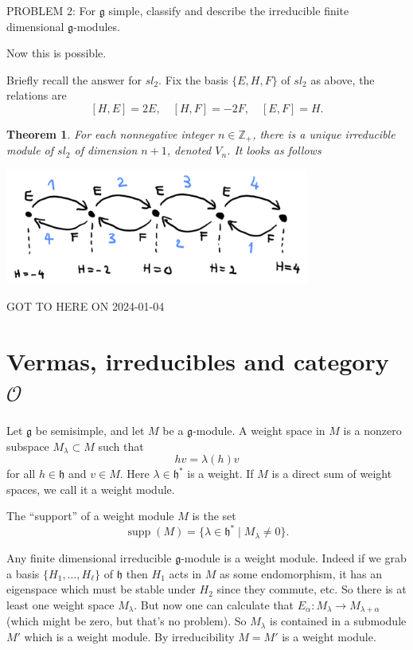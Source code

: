 \documentclass[12pt]{article}
\theoremstyle{plain}
\newtheorem{thm}{Theorem}[section]
\theoremstyle{definition}
\numberwithin{equation}{section}
\DeclareMathOperator{\supp}{supp}
\newcommand{\al}{\alpha}
\newcommand{\la}{\lambda}
\newcommand{\Z}{\mathbb{Z}}
\newcommand{\g}{\mathfrak{g}}
\newcommand{\h}{\mathfrak{h}}
\newcommand{\OO}{\mathcal{O}}
\begin{document}
PROBLEM 2: For $\g$ simple, classify and describe the irreducible finite dimensional $\g$-modules.

Now this is possible.

Briefly recall the answer for $sl_2$. Fix the basis $\{E, H, F\}$ of $sl_2$ as above, the relations are
\[
[H, E] = 2E, \quad [H, F] = -2F, \quad [E, F] = H.
\]
\begin{thm}
For each nonnegative integer $n \in \Z_+$, there is a unique irreducible module of $sl_2$ of dimension $n+1$, denoted $V_n$. It looks as follows
\begin{center}
\includegraphics[width=100mm]{sl2_chain_corrected.png}
\end{center}
\end{thm}

{\color{red}GOT TO HERE ON 2024-01-04}






\section{Vermas, irreducibles and category $\OO$}

Let $\g$ be semisimple, and let $M$ be a $\g$-module. A weight space in $M$ is a nonzero subspace $M_\la \subset M$ such that
\[
h v = \la(h) v
\]
for all $h \in \h$ and $v \in M$. Here $\la \in \h^*$ is a weight. If $M$ is a direct sum of weight spaces, we call it a weight module.

The ``support'' of a weight module $M$ is the set
\[
\supp(M) = \{\la \in \h^* \mid M_\la \neq 0\}.
\]


Any finite dimensional irreducible $\g$-module is a weight module. Indeed if we grab a basis $\{H_1, \ldots, H_\ell\}$ of $\h$ then $H_1$ acts in $M$ as some endomorphism, it has an eigenspace which must be stable under $H_2$ since they commute, etc. So there is at least one weight space $M_\la$. But now one can calculate that $E_\al : M_\la \rightarrow M_{\la+\al}$ (which might be zero, but that's no problem). So $M_\la$ is contained in a submodule $M'$ which is a weight module. By irreducibility $M = M'$ is a weight module.
\end{document}
